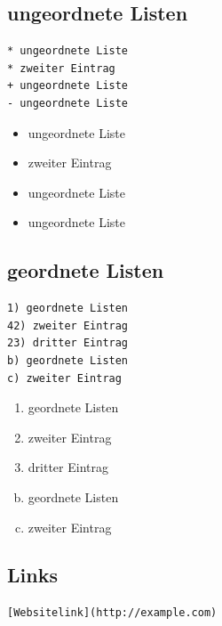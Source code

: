 
\subsection{ungeordnete Listen}

\begin{verbatim}
* ungeordnete Liste
* zweiter Eintrag
+ ungeordnete Liste
- ungeordnete Liste
\end{verbatim}

\begin{itemize}
\item
  ungeordnete Liste
\item
  zweiter Eintrag
\item
  ungeordnete Liste
\item
  ungeordnete Liste
\end{itemize}

\subsection{geordnete Listen}

\begin{verbatim}
1) geordnete Listen
42) zweiter Eintrag
23) dritter Eintrag
b) geordnete Listen
c) zweiter Eintrag
\end{verbatim}

\begin{enumerate}[1)]
\item
  geordnete Listen
\item
  zweiter Eintrag
\item
  dritter Eintrag
\end{enumerate}

\begin{enumerate}[a)]
\setcounter{enumi}{1}
\item
  geordnete Listen
\item
  zweiter Eintrag
\end{enumerate}

\subsection{Links}

\begin{verbatim}
[Websitelink](http://example.com)
\end{verbatim}

